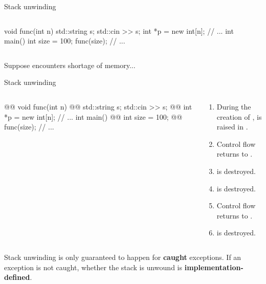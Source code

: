 \documentclass[aspectratio=169]{beamer}
\begin{document}
\begin{frame}[fragile]{Stack unwinding}
  \begin{columns}
    \begin{column}{0.5\textwidth}
      \begin{cpp}[\small]
    void func(int n) {
      std::string s;
      std::cin >> s;
      int *p = new int[n];
      // ...
    }
    int main() {
      int size = 100;
      func(size);
      // ...
    }
      \end{cpp}
    \end{column}
    \begin{column}{0.5\textwidth}
    \end{column}
  \end{columns}
  Suppose  encounters shortage of memory...
\end{frame}

\begin{frame}[fragile]{Stack unwinding}
  \begin{columns}
    \begin{column}{0.4\linewidth}
      \begin{cpp}[\small]
@\onslide<4>{\pinkbox}@    void func(int n) {
@@      std::string s;
      std::cin >> s;
@@    int *p = new int[n];
      // ...
    }
    int main() {
@\onslide<6>{\pinkbox}@      int size = 100;
@@      func(size);
      // ...
    }
      \end{cpp}
    \end{column}
    \begin{column}{0.6\linewidth}
      \begin{enumerate}
        \item During the creation of ,  is raised in .
        \item Control flow returns to .
        \item {} is destroyed.
        \item {} is destroyed.
        \item Control flow returns to .
        \item {} is destroyed.
      \end{enumerate}
    \end{column}
  \end{columns}
  \begin{notice}
    Stack unwinding is only guaranteed to happen for \textbf{caught} exceptions. If an exception is not caught, whether the stack is unwound is \textbf{implementation-defined}.
  \end{notice}
\end{frame}
\end{document}
